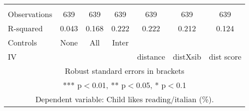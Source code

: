 \begin{tabular}{lcccccc}
 &  &  &  &  &  &  \\
Observations & 639 & 639 & 639 & 639 & 639 & 639 \\
R-squared & 0.043 & 0.168 & 0.222 & 0.222 & 0.212 & 0.124 \\
Controls & None & All & Inter &  &  &  \\
 IV &  &  &  & distance & distXsib & dist score \\ \hline
\multicolumn{7}{c}{ Robust standard errors in brackets} \\
\multicolumn{7}{c}{ *** p$<$0.01, ** p$<$0.05, * p$<$0.1} \\
\multicolumn{7}{c}{ Dependent variable: Child likes reading/italian (\%).} \\
\end{tabular}

